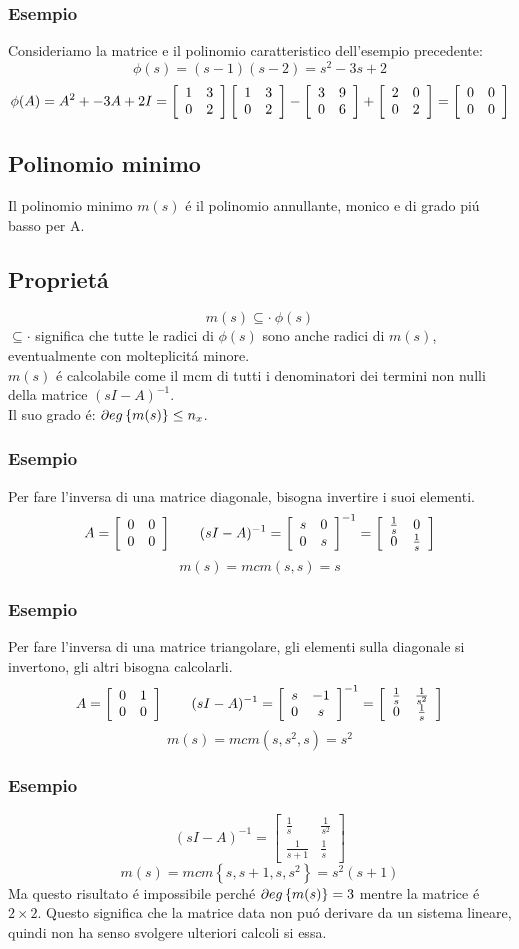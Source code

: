 \documentclass[../main.tex]{subfiles}
\begin{document}
	\subsubsection*{Esempio}
		Consideriamo la matrice e il polinomio caratteristico dell'esempio precedente:
		\[ \phi(s) = (s-1)(s-2) = s^2 - 3s + 2 \]
		\[ \phi(A) = A^2 + -3A + 2I = \left[ \begin{array}{cc} 1 & 3\\ 0 & 2 \end{array} \right] \left[ \begin{array}{cc} 1 & 3\\ 0 & 2 \end{array} \right] - \left[ \begin{array}{cc} 3 & 9\\ 0 & 6 \end{array} \right] + \left[ \begin{array}{cc} 2 & 0\\ 0 & 2 \end{array} \right] = \left[ \begin{array}{cc} 0 & 0\\ 0 & 0 \end{array} \right]\]
		
	\subsection{Polinomio minimo}
		Il polinomio minimo $ m(s) $ \'e il polinomio annullante, monico e di grado pi\'u basso per A.
	\subsection*{Propriet\'a}
		\[ m(s) \subseteq \cdot\ \phi(s) \]
		$ \subseteq \cdot $ significa che tutte le radici di $ \phi(s) $ sono anche radici di $ m(s) $, eventualmente con molteplicit\'a minore.\\
		\linebreak
		$ m(s) $ \'e calcolabile come il mcm di tutti i denominatori dei termini non nulli della matrice $ (sI - A)^{-1} $.\\
		Il suo grado \'e: $ \partial eg \left\lbrace m(s) \right\rbrace \leq n_x $.\\
	\subsubsection*{Esempio}
		Per fare l'inversa di una matrice diagonale, bisogna invertire i suoi elementi. 
		\[ A = \left[ \begin{array}{cc} 0 & 0\\ 0 & 0 \end{array} \right] \qquad (sI - A)^{-1} = \left[ \begin{array}{cc} s & 0\\ 0 & s \end{array} \right]^{-1} = \left[ \begin{array}{cc} \frac{1}{s} & 0\\ 0 & \frac{1}{s} \end{array} \right] \]
		\[ m(s) = mcm( s, s) = s \]
	\subsubsection*{Esempio}
		Per fare l'inversa di una matrice triangolare, gli elementi sulla diagonale si invertono, gli altri bisogna calcolarli.
		\[ A = \left[ \begin{array}{cc} 0 & 1\\ 0 & 0 \end{array} \right] \qquad (sI - A)^{-1} = \left[ \begin{array}{cc} s & -1\\ 0 & s \end{array} \right]^{-1} = \left[ \begin{array}{cc} \frac{1}{s} & \frac{1}{s^2}\\ 0 & \frac{1}{s} \end{array} \right] \]
		\[ m(s) = mcm( s, s^2, s) = s^2 \]
	\subsubsection*{Esempio}
		\[
			(sI-A)^{-1} =
			\begin{bmatrix}
				\frac{1}{s} & \frac{1}{s^2}\\
				\frac{1}{s+1} & \frac{1}{s}
			\end{bmatrix}
		\]
		\[ m(s) = mcm \left\lbrace s, s+1, s, s^2 \right\rbrace = s^2(s+1) \]
		Ma questo risultato \'e impossibile perch\'e $ \partial eg \left\lbrace m(s) \right\rbrace = 3 $ mentre la matrice \'e $ 2 \times 2 $. Questo significa che la matrice data non pu\'o derivare da un sistema lineare, quindi non ha senso svolgere ulteriori calcoli si essa.
		
\end{document}
